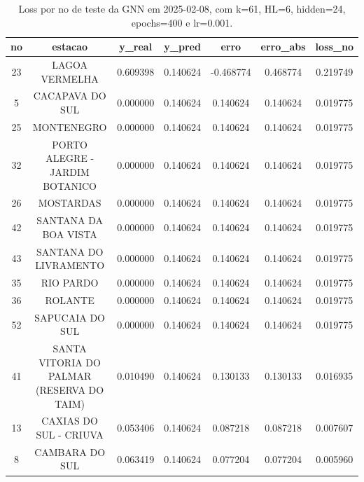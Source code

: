\begin{table}[h]
\centering
\caption{Loss por no de teste da GNN em 2025-02-08, com k=61, HL=6, hidden=24, epochs=400 e lr=0.001.}
\label{tab:gnn_loss_k61_hl6_h24_e400_d20250208}
\begin{tabular}{ccccccc}
\toprule
no & estacao & y\_real & y\_pred & erro & erro\_abs & loss\_no \\
\midrule
23 & LAGOA VERMELHA & 0.609398 & 0.140624 & -0.468774 & 0.468774 & 0.219749 \\
5 & CACAPAVA DO SUL & 0.000000 & 0.140624 & 0.140624 & 0.140624 & 0.019775 \\
25 & MONTENEGRO & 0.000000 & 0.140624 & 0.140624 & 0.140624 & 0.019775 \\
32 & PORTO ALEGRE - JARDIM BOTANICO & 0.000000 & 0.140624 & 0.140624 & 0.140624 & 0.019775 \\
26 & MOSTARDAS & 0.000000 & 0.140624 & 0.140624 & 0.140624 & 0.019775 \\
42 & SANTANA DA BOA VISTA & 0.000000 & 0.140624 & 0.140624 & 0.140624 & 0.019775 \\
43 & SANTANA DO LIVRAMENTO & 0.000000 & 0.140624 & 0.140624 & 0.140624 & 0.019775 \\
35 & RIO PARDO & 0.000000 & 0.140624 & 0.140624 & 0.140624 & 0.019775 \\
36 & ROLANTE & 0.000000 & 0.140624 & 0.140624 & 0.140624 & 0.019775 \\
52 & SAPUCAIA DO SUL & 0.000000 & 0.140624 & 0.140624 & 0.140624 & 0.019775 \\
41 & SANTA VITORIA DO PALMAR (RESERVA DO TAIM) & 0.010490 & 0.140624 & 0.130133 & 0.130133 & 0.016935 \\
13 & CAXIAS DO SUL - CRIUVA & 0.053406 & 0.140624 & 0.087218 & 0.087218 & 0.007607 \\
8 & CAMBARA DO SUL & 0.063419 & 0.140624 & 0.077204 & 0.077204 & 0.005960 \\
\bottomrule
\end{tabular}
\end{table}
